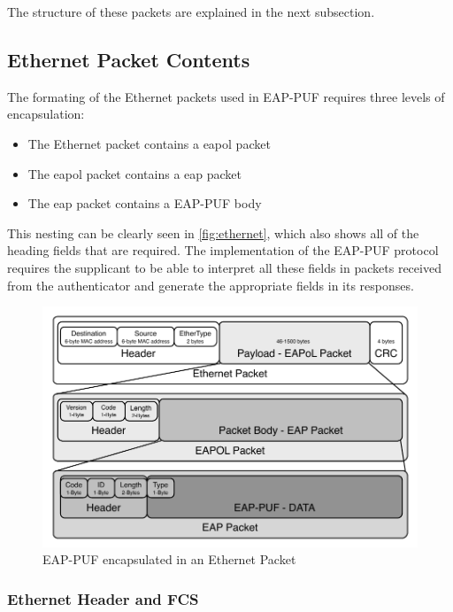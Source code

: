 The structure of these packets are explained in the next subsection.

\subsection{Ethernet Packet Contents}

The formating of the Ethernet packets used in EAP-PUF requires three levels of
encapsulation:

\begin{itemize}
\item The Ethernet packet contains a \gls{eapol} packet
\item The \gls{eapol} packet contains a \gls{eap} packet
\item The \gls{eap} packet contains a EAP-PUF body
\end{itemize}

This nesting can be clearly seen in \autoref{fig:ethernet}, which also shows all
of the heading fields that are required. The implementation of the EAP-PUF
protocol requires the supplicant to be able to interpret all these fields in
packets received from the authenticator and
generate the appropriate fields in its responses.

\begin{figure}
  \centering
  \includegraphics[scale=0.9]{images/ethernet}
  \caption{EAP-PUF encapsulated in an Ethernet Packet}
  \label{fig:ethernet}
\end{figure}

\subsubsection{Ethernet Header and FCS}

